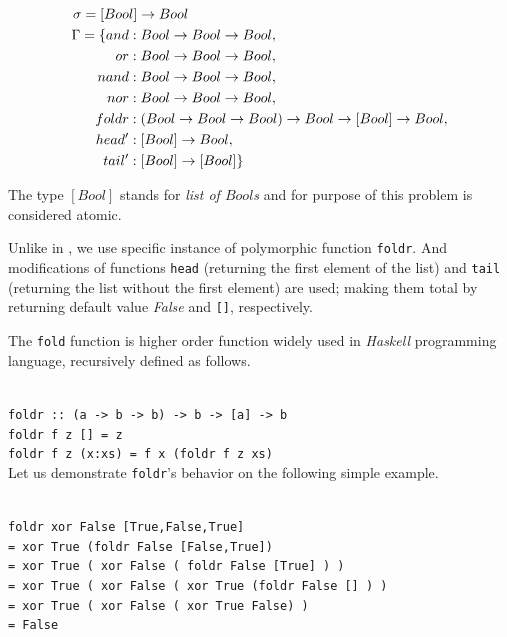 \documentclass[12pt,a4paper]{report}
\newcommand{\Lets}{Let us\xspace}
\begin{document}
\begin{align*}
\sigma = [Boo&l] \rightarrow Bool\\
\Gamma = \{
  and   &: Bool \rightarrow Bool \rightarrow Bool                              ,\\
  or    &: Bool \rightarrow Bool \rightarrow Bool                              ,\\
  nand  &: Bool \rightarrow Bool \rightarrow Bool                              ,\\
  nor   &: Bool \rightarrow Bool \rightarrow Bool                              ,\\
  foldr &: (Bool \rightarrow Bool \rightarrow Bool) \rightarrow Bool \rightarrow [Bool] \rightarrow Bool ,\\
  head' &: [Bool] \rightarrow Bool                                   ,\\
  tail' &: [Bool] \rightarrow [Bool]                              \}\\
\end{align*}

The type $[Bool]$ stands for \textit{list of $Bool$s} and for purpose of
this problem is considered atomic.

Unlike in \cite{yu01}, we use specific instance of polymorphic 
function \texttt{foldr}. 
And modifications of functions \texttt{head} 
(returning the first element of the list) 
and \texttt{tail} (returning the list without the first element) are used; 
making them total by returning default value \textit{False}
and \texttt{[]}, respectively.

The \texttt{fold} function is higher order function widely used in \textit{Haskell}
programming language, recursively defined as follows.

\texttt{~\\
foldr :: (a -> b -> b) -> b -> [a] -> b \\
foldr f z []     = z \\
foldr f z (x:xs) = f x (foldr f z xs)  
}\\

\Lets demonstrate \texttt{foldr}'s behavior on the following simple example.

\texttt{~\\
foldr xor False [True,False,True] \\
= xor True (foldr False [False,True]) \\
= xor True ( xor False ( foldr False [True] ) )\\
= xor True ( xor False ( xor True (foldr False [] ) )\\
= xor True ( xor False ( xor True False) )\\
= False
}\\
\end{document}
